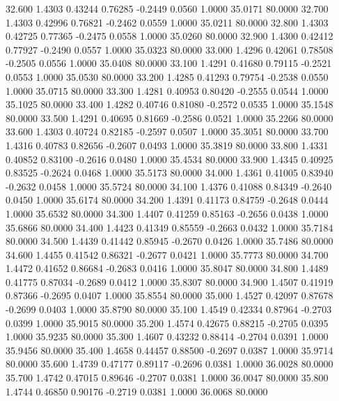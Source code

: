   32.600   1.4303   0.43244   0.76285  -0.2449   0.0560   1.0000  35.0171  80.0000
  32.700   1.4303   0.42996   0.76821  -0.2462   0.0559   1.0000  35.0211  80.0000
  32.800   1.4303   0.42725   0.77365  -0.2475   0.0558   1.0000  35.0260  80.0000
  32.900   1.4300   0.42412   0.77927  -0.2490   0.0557   1.0000  35.0323  80.0000
  33.000   1.4296   0.42061   0.78508  -0.2505   0.0556   1.0000  35.0408  80.0000
  33.100   1.4291   0.41680   0.79115  -0.2521   0.0553   1.0000  35.0530  80.0000
  33.200   1.4285   0.41293   0.79754  -0.2538   0.0550   1.0000  35.0715  80.0000
  33.300   1.4281   0.40953   0.80420  -0.2555   0.0544   1.0000  35.1025  80.0000
  33.400   1.4282   0.40746   0.81080  -0.2572   0.0535   1.0000  35.1548  80.0000
  33.500   1.4291   0.40695   0.81669  -0.2586   0.0521   1.0000  35.2266  80.0000
  33.600   1.4303   0.40724   0.82185  -0.2597   0.0507   1.0000  35.3051  80.0000
  33.700   1.4316   0.40783   0.82656  -0.2607   0.0493   1.0000  35.3819  80.0000
  33.800   1.4331   0.40852   0.83100  -0.2616   0.0480   1.0000  35.4534  80.0000
  33.900   1.4345   0.40925   0.83525  -0.2624   0.0468   1.0000  35.5173  80.0000
  34.000   1.4361   0.41005   0.83940  -0.2632   0.0458   1.0000  35.5724  80.0000
  34.100   1.4376   0.41088   0.84349  -0.2640   0.0450   1.0000  35.6174  80.0000
  34.200   1.4391   0.41173   0.84759  -0.2648   0.0444   1.0000  35.6532  80.0000
  34.300   1.4407   0.41259   0.85163  -0.2656   0.0438   1.0000  35.6866  80.0000
  34.400   1.4423   0.41349   0.85559  -0.2663   0.0432   1.0000  35.7184  80.0000
  34.500   1.4439   0.41442   0.85945  -0.2670   0.0426   1.0000  35.7486  80.0000
  34.600   1.4455   0.41542   0.86321  -0.2677   0.0421   1.0000  35.7773  80.0000
  34.700   1.4472   0.41652   0.86684  -0.2683   0.0416   1.0000  35.8047  80.0000
  34.800   1.4489   0.41775   0.87034  -0.2689   0.0412   1.0000  35.8307  80.0000
  34.900   1.4507   0.41919   0.87366  -0.2695   0.0407   1.0000  35.8554  80.0000
  35.000   1.4527   0.42097   0.87678  -0.2699   0.0403   1.0000  35.8790  80.0000
  35.100   1.4549   0.42334   0.87964  -0.2703   0.0399   1.0000  35.9015  80.0000
  35.200   1.4574   0.42675   0.88215  -0.2705   0.0395   1.0000  35.9235  80.0000
  35.300   1.4607   0.43232   0.88414  -0.2704   0.0391   1.0000  35.9456  80.0000
  35.400   1.4658   0.44457   0.88500  -0.2697   0.0387   1.0000  35.9714  80.0000
  35.600   1.4739   0.47177   0.89117  -0.2696   0.0381   1.0000  36.0028  80.0000
  35.700   1.4742   0.47015   0.89646  -0.2707   0.0381   1.0000  36.0047  80.0000
  35.800   1.4744   0.46850   0.90176  -0.2719   0.0381   1.0000  36.0068  80.0000
